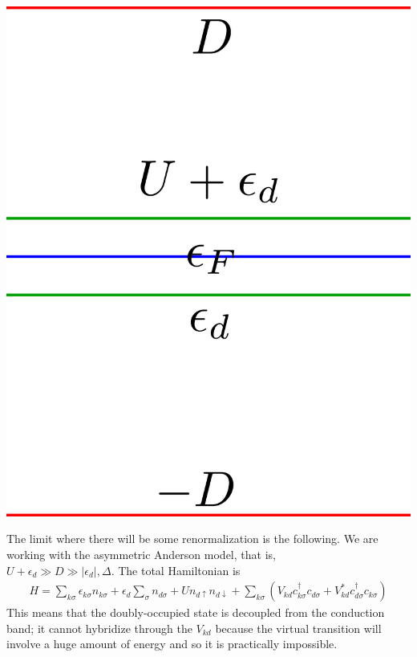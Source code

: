 \documentclass[twoside]{report}
\numberwithin{equation}{section}
\begin{document}
\begin{minipage}{0.45\textwidth}
    \centering
    \includegraphics[width=\textwidth]{../figures/anderson2.png}
    \label{and2}
\end{minipage}
The limit where there will be some renormalization is the following.
We are working with the asymmetric Anderson model, that is,\\ \(U + \epsilon_d \gg D \gg |\epsilon_d|,\Delta\).
The total Hamiltonian is
\begin{equation}\begin{aligned}
	H = \sum_{k\sigma} \epsilon_{k\sigma}n_{k\sigma} + \epsilon_d \sum_\sigma n_{d\sigma} + U n_{d\uparrow}n_{d\downarrow} + \sum_{k\sigma}\left(V_{kd} c^\dagger_{k\sigma}c_{d\sigma} + V^*_{kd}c^\dagger_{d\sigma}c_{k\sigma}\right)
\end{aligned}\end{equation}
This means that the doubly-occupied state is decoupled from the conduction band; it cannot hybridize through the \(V_{kd}\) because the virtual transition will involve a huge amount of energy and so it is practically impossible.\\\\
\end{document}
